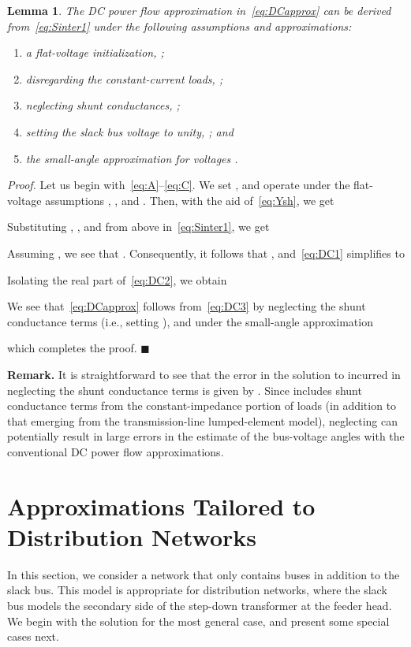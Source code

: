 \documentclass[10 pt, conference]{ieeeconf}
\newtheorem{lemma}{Lemma}
\newcommand{\qedblack}{\hfill \ensuremath{\blacksquare}}
\begin{document}
\begin{lemma}
The DC power flow approximation in~\eqref{eq:DCapprox} can be derived from~\eqref{eq:Sinter1} under the following assumptions and approximations:
\begin{enumerate}
\item a flat-voltage initialization, ; 
\item disregarding the constant-current loads, ;  
\item neglecting shunt conductances, ; 
\item setting the slack bus voltage to unity, ; and 
\item the small-angle approximation for voltages .
\end{enumerate}
\end{lemma}

\noindent \emph{Proof.} Let us begin with~\eqref{eq:A}--\eqref{eq:C}. We set , and operate under the flat-voltage assumptions , , and . Then, with the aid of~\eqref{eq:Ysh}, we get

Substituting , , and  from above in~\eqref{eq:Sinter1}, we get

Assuming , we see that . Consequently, it follows that , and~\eqref{eq:DC1} simplifies to

Isolating the real part of~\eqref{eq:DC2}, we obtain

We see that~\eqref{eq:DCapprox} follows from~\eqref{eq:DC3} by neglecting the shunt conductance terms (i.e., setting ), and under the small-angle approximation

which completes the proof. \qedblack

\noindent \textbf{Remark.} It is straightforward to see that the error in the solution to  incurred in neglecting the shunt conductance terms is given by . Since  includes shunt conductance terms from the constant-impedance portion of  loads (in addition to that emerging from the transmission-line lumped-element model), neglecting  can potentially result in large errors in the estimate of the bus-voltage angles with the conventional DC power flow approximations.

\section{Approximations Tailored to Distribution Networks} \label{sec:Distribution}
In this section, we consider a network that only contains  buses in addition to the slack bus. This model is appropriate for distribution networks, where the slack bus models the secondary side of the step-down transformer at the feeder head. We begin with the solution for the most general case, and present some special cases next. 
\end{document}
